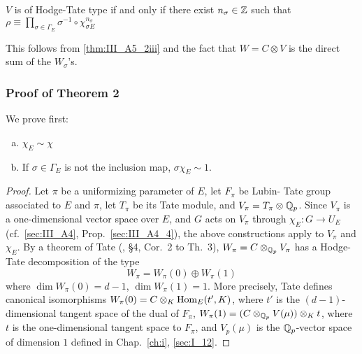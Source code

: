 \begin{subappendices}

\dpage

\begin{cor}
$V$ is of Hodge-Tate type if and only if there exist $n_\sigma \in \mathbb{Z}$ such that
$\rho \equiv \prod_{\sigma \in \Gamma_E} \sigma^{-1} \circ \chi_{\sigma
E}^{n_\sigma}$
\end{cor}

This follows from \ref{thm:III_A5_2iii} and the fact that $W = C \otimes V$ is
the direct sum of the $W_\sigma$'s.

\subsubsection{Proof of Theorem 2}

We prove first:

\begin{lem}\label{lem:III_A5_2}
\begin{enumerate}[(a)]
	\item $\chi_E \sim \chi$
	\item If $\sigma \in \Gamma_E$ is not the inclusion map, $\sigma \chi_E
\sim 1$.
\end{enumerate}
\end{lem}

\begin{proof}
Let $\pi$ be a uniformizing parameter of $E$, let $F_\pi$ be Lubin- Tate group
associated to $E$ and $\pi$, let $T_\pi$ be its Tate module, and $V_\pi = T_\pi
\otimes \mathbb{Q}_p$. Since $V_\pi$ is a one-dimensional vector space over $E$, and $G$
acts on $V_\pi$ through $\chi_E \colon G \to U_E$ (cf.\ \ref{sec:III_A4},
Prop.~\ref{sec:III_A4_4}), the above constructions apply to $V_\pi$ and
$\chi_E$. By a theorem of Tate (\cite{39}, \S4, Cor.~2 to Th.~3), $W_\pi = C
\otimes_{\mathbb{Q}_p} V_\pi$ has a Hodge-Tate decomposition of the type
\[
	W_\pi = W_\pi(0) \oplus W_\pi(1)
\]
where $\dim W_\pi(0) = d - 1$, $\dim W_\pi (1) = 1$. More precisely, Tate
defines canonical isomorphisms $W_\pi(0) = C \otimes_K \operatorname{Hom}_E(t',K)$, where $t'$ 
\dpage 
is the $(d-1)$-dimensional tangent space of the dual of $F_\pi$, $W_\pi(1) = (C
\otimes_{\mathbb{Q}_p} V(\mu)) \otimes_K t$, where $t$ is the one-dimensional
tangent space to $F_\pi$, and $V_p(\mu)$ is the $\mathbb{Q}_p$-vector space of dimension
$1$ defined in Chap.~\ref{ch:i}, \ref{sec:I_12}.


\end{proof}
\end{subappendices}
